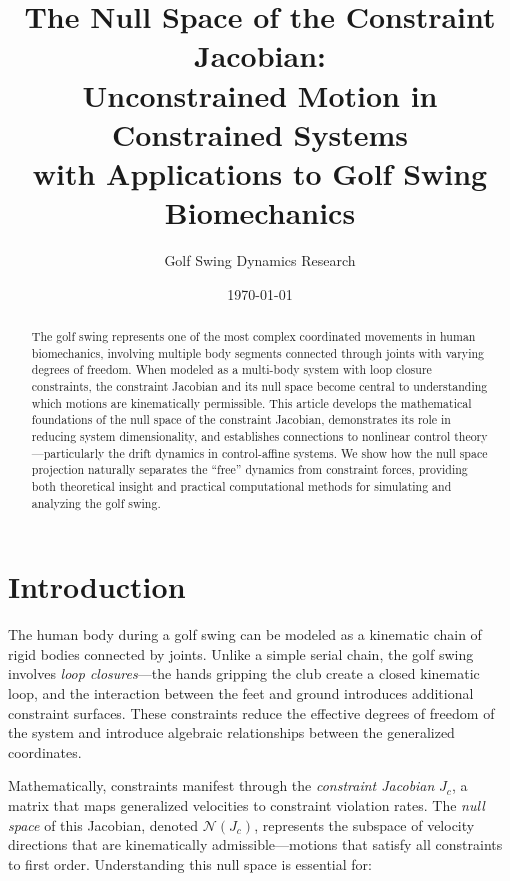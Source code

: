 \documentclass[11pt,a4paper]{article}
\theoremstyle{definition}
\newcommand{\nullspace}{\mathcal{N}}
\newcommand{\Jc}{J_c}
\begin{document}
\title{The Null Space of the Constraint Jacobian:\\
Unconstrained Motion in Constrained Systems\\
with Applications to Golf Swing Biomechanics}

\author{Golf Swing Dynamics Research}
\date{\today}

\maketitle

\begin{abstract}
The golf swing represents one of the most complex coordinated movements in human biomechanics, involving multiple body segments connected through joints with varying degrees of freedom. When modeled as a multi-body system with loop closure constraints, the constraint Jacobian and its null space become central to understanding which motions are kinematically permissible. This article develops the mathematical foundations of the null space of the constraint Jacobian, demonstrates its role in reducing system dimensionality, and establishes connections to nonlinear control theory---particularly the drift dynamics in control-affine systems. We show how the null space projection naturally separates the ``free'' dynamics from constraint forces, providing both theoretical insight and practical computational methods for simulating and analyzing the golf swing.
\end{abstract}

\tableofcontents

\section{Introduction}

The human body during a golf swing can be modeled as a kinematic chain of rigid bodies connected by joints. Unlike a simple serial chain, the golf swing involves \emph{loop closures}---the hands gripping the club create a closed kinematic loop, and the interaction between the feet and ground introduces additional constraint surfaces. These constraints reduce the effective degrees of freedom of the system and introduce algebraic relationships between the generalized coordinates.

Mathematically, constraints manifest through the \emph{constraint Jacobian} $\Jc$, a matrix that maps generalized velocities to constraint violation rates. The \emph{null space} of this Jacobian, denoted $\nullspace(\Jc)$, represents the subspace of velocity directions that are kinematically admissible---motions that satisfy all constraints to first order. Understanding this null space is essential for:
\end{document}
